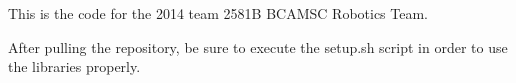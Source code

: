 This is the code for the 2014 team 2581\+B B\+C\+A\+M\+S\+C Robotics Team.

After pulling the repository, be sure to execute the {\ttfamily setup.\+sh} script in order to use the libraries properly. 